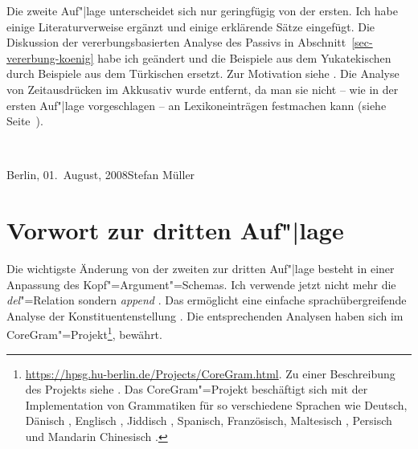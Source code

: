 Die zweite Auf"|lage unterscheidet sich nur geringfügig von der ersten. Ich habe einige
Literaturverweise ergänzt und einige erklärende Sätze eingefügt. Die Diskussion der
vererbungsbasierten Analyse des Passivs in Abschnitt~\ref{sec-vererbung-koenig} habe ich geändert und
die Beispiele aus dem Yukatekischen durch Beispiele aus dem Türkischen
ersetzt. Zur Motivation siehe . Die Analyse von Zeitausdrücken im
Akkusativ wurde entfernt, da man sie nicht -- wie in der ersten Auf"|lage vorgeschlagen -- an Lexikoneinträgen festmachen kann 
(siehe Seite~\pageref{bsp-den-groessten-Teil-der-Woche}).


~\medskip

\noindent
Berlin, 01.\ August, 2008\hfill Stefan Müller

\section*{Vorwort zur dritten Auf"|lage}

Die wichtigste Änderung von der zweiten zur dritten Auf"|lage besteht in einer Anpassung des
Kopf"=Argument"=Schemas. Ich verwende jetzt nicht mehr die \emph{del}"=Relation sondern
\emph{append} \citep[Abschnitt~8.4]{MuellerGTBuch1}. Das ermöglicht eine einfache sprachübergreifende Analyse der Konstituentenstellung
\citep{MuellerCopula}. Die entsprechenden Analysen haben sich im CoreGram"=Projekt\footnote{
  \url{https://hpsg.hu-berlin.de/Projects/CoreGram.html}. Zu einer Beschreibung des Projekts siehe . Das CoreGram"=Projekt beschäftigt sich mit der Implementation von Grammatiken für so
verschiedene Sprachen wie Deutsch, Dänisch
\citep{MOe2011a,MuellerPredication,MuellerCopula,MOeDanish}, Englisch
\citep{MuellerPredication,MuellerCopula}, Jiddisch \citep{MOe2011a}, Spanisch, Französisch,
Maltesisch \citep{MuellerMalteseSketch},
Persisch \citep{MuellerPersian} und Mandarin Chinesisch \citep{Lipenkova2009a,ML2009a}.
}, bewährt. 

